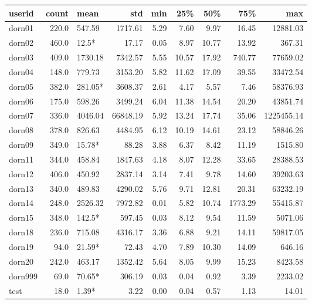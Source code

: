 \begin{tabular}{lrlrrrrrr}
\toprule
  userid &  count &     mean &       std &   min &    25\% &    50\% &      75\% &         max \\
\midrule
  dorn01 &  220.0 &   547.59 &   1717.61 &  5.29 &   7.60 &   9.97 &    16.45 &    12881.03 \\
  dorn02 &  460.0 &    12.5* &     17.17 &  0.05 &   8.97 &  10.77 &    13.92 &      367.31 \\
  dorn03 &  409.0 &  1730.18 &   7342.57 &  5.55 &  10.57 &  17.92 &   740.77 &    77659.02 \\
  dorn04 &  148.0 &   779.73 &   3153.20 &  5.82 &  11.62 &  17.09 &    39.55 &    33472.54 \\
  dorn05 &  382.0 &  281.05* &   3608.37 &  2.61 &   4.17 &   5.57 &     7.46 &    58376.93 \\
  dorn06 &  175.0 &   598.26 &   3499.24 &  6.04 &  11.38 &  14.54 &    20.20 &    43851.74 \\
  dorn07 &  336.0 &  4046.04 &  66848.19 &  5.92 &  13.24 &  17.74 &    35.06 &  1225455.14 \\
  dorn08 &  378.0 &   826.63 &   4484.95 &  6.12 &  10.19 &  14.61 &    23.12 &    58846.26 \\
  dorn09 &  349.0 &   15.78* &     88.28 &  3.88 &   6.37 &   8.42 &    11.19 &     1515.80 \\
  dorn11 &  344.0 &   458.84 &   1847.63 &  4.18 &   8.07 &  12.28 &    33.65 &    28388.53 \\
  dorn12 &  406.0 &   450.92 &   2837.14 &  3.14 &   7.41 &   9.78 &    14.60 &    39203.63 \\
  dorn13 &  340.0 &   489.83 &   4290.02 &  5.76 &   9.71 &  12.81 &    20.31 &    63232.19 \\
  dorn14 &  248.0 &  2526.32 &   7972.82 &  0.01 &   5.82 &  10.74 &  1773.29 &    55415.87 \\
  dorn15 &  348.0 &   142.5* &    597.45 &  0.03 &   8.12 &   9.54 &    11.59 &     5071.06 \\
  dorn18 &  236.0 &   715.08 &   4316.17 &  3.36 &   6.88 &   9.21 &    14.11 &    59817.05 \\
  dorn19 &   94.0 &   21.59* &     72.43 &  4.70 &   7.89 &  10.30 &    14.09 &      646.16 \\
  dorn20 &  242.0 &   463.17 &   1352.42 &  5.64 &   8.05 &   9.99 &    15.23 &     8423.58 \\
 dorn999 &   69.0 &   70.65* &    306.19 &  0.03 &   0.04 &   0.92 &     3.39 &     2233.02 \\
    test &   18.0 &    1.39* &      3.22 &  0.00 &   0.04 &   0.57 &     1.13 &       14.01 \\
\bottomrule
\end{tabular}

